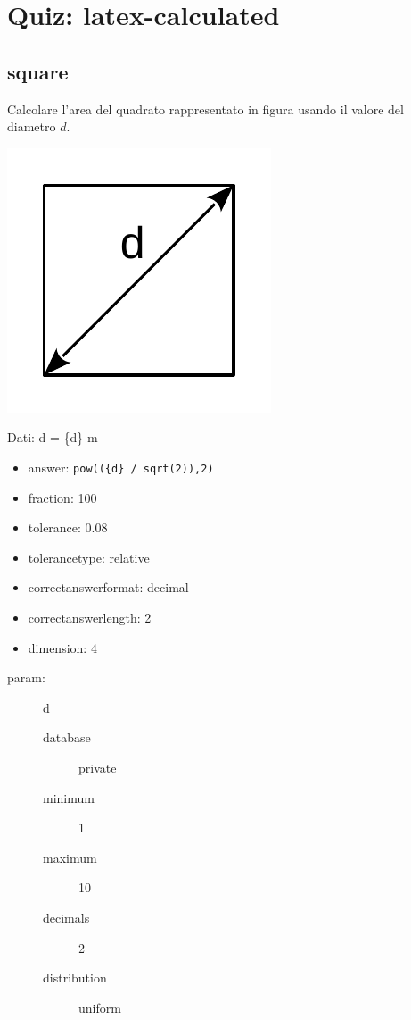 \documentclass{article}
\begin{document}
	

\section{Quiz: latex-calculated}

\subsection{square}
Calcolare l'area del quadrato rappresentato in figura usando il valore del diametro $d$.

\includegraphics[width=0.3\columnwidth]{./img/square}

Dati: d = \{d\} m

\begin{itemize}
	\item answer: \texttt{pow((\{d\} / sqrt(2)),2)}
	\item fraction: 100
	\item tolerance: 0.08
	\item tolerancetype: relative %
	\item correctanswerformat: decimal %
	\item correctanswerlength: 2
	\item dimension: 4
\end{itemize}

\begin{description}
	\item[param:] d
	\begin{description}
		\item[database] private  %
		\item[minimum] 1          %
		\item[maximum] 10          %
		\item[decimals] 2          %
		\item[distribution] uniform   %
	\end{description}
\end{description}
\end{document}
